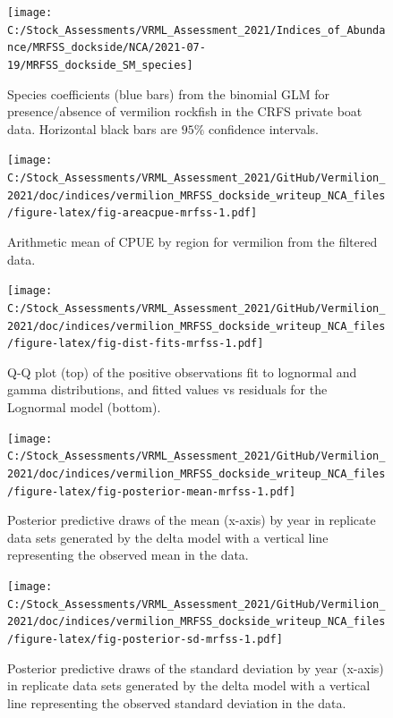 \documentclass[11pt,
  english,
]{article}
\begin{document}
\FloatBarrier

\begin{figure}
\texttt{[image: C:/Stock\_Assessments/VRML\_Assessment\_2021/Indices\_of\_Abundance/MRFSS\_dockside/NCA/2021-07-19/MRFSS\_dockside\_SM\_species]} \caption{Species coefficients (blue bars) from the binomial GLM for presence/absence of vermilion rockfish in the CRFS private boat data. Horizontal black bars are $95\%$ confidence intervals.}\label{fig:fig-sm-mrfss}
\end{figure}

\FloatBarrier

\begin{figure}
\centering
\texttt{[image: C:/Stock\_Assessments/VRML\_Assessment\_2021/GitHub/Vermilion\_2021/doc/indices/vermilion\_MRFSS\_dockside\_writeup\_NCA\_files/figure-latex/fig-areacpue-mrfss-1.pdf]}
\caption{\label{fig:fig-areacpue-mrfss}Arithmetic mean of CPUE by region for vermilion from the filtered data.}
\end{figure}

\begin{figure}
\centering
\texttt{[image: C:/Stock\_Assessments/VRML\_Assessment\_2021/GitHub/Vermilion\_2021/doc/indices/vermilion\_MRFSS\_dockside\_writeup\_NCA\_files/figure-latex/fig-dist-fits-mrfss-1.pdf]}
\caption{\label{fig:fig-dist-fits-mrfss}Q-Q plot (top) of the positive observations fit to lognormal and gamma distributions, and fitted values vs residuals for the Lognormal model (bottom).}
\end{figure}

\begin{figure}
\centering
\texttt{[image: C:/Stock\_Assessments/VRML\_Assessment\_2021/GitHub/Vermilion\_2021/doc/indices/vermilion\_MRFSS\_dockside\_writeup\_NCA\_files/figure-latex/fig-posterior-mean-mrfss-1.pdf]}
\caption{\label{fig:fig-posterior-mean-mrfss}Posterior predictive draws of the mean (x-axis) by year in replicate data sets generated by the delta model with a vertical line representing the observed mean in the data.}
\end{figure}

\FloatBarrier

\begin{figure}
\centering
\texttt{[image: C:/Stock\_Assessments/VRML\_Assessment\_2021/GitHub/Vermilion\_2021/doc/indices/vermilion\_MRFSS\_dockside\_writeup\_NCA\_files/figure-latex/fig-posterior-sd-mrfss-1.pdf]}
\caption{\label{fig:fig-posterior-sd-mrfss}Posterior predictive draws of the standard deviation by year (x-axis) in replicate data sets generated by the delta model with a vertical line representing the observed standard deviation in the data.}
\end{figure}
\end{document}
